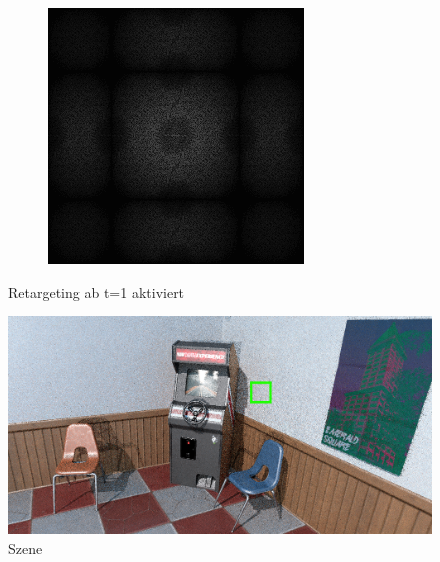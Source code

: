 \begin{figure}[H]
\begin{tcolorbox}[boxrule=4pt,sharp corners=downhill,title=Retargeting]
\begin{subfigure}[b]{0.2\textwidth}
        \includegraphics[width=\textwidth]{content/TemporalerAlg/Bilder/Retargeting/Spektren/Ausschnitt4.png}
        \label{pic:sorting_retarget_t4_FFT}
    \end{subfigure}
    \end{tcolorbox}
    \caption{Retargeting ab t=1 aktiviert}
    \label{pic:Sorting_retarget_over_seven_frames} 
\end{figure}

\begin{figure}[H]
    \centering \includegraphics[scale=.25]{content/TemporalerAlg/Bilder/Retargeting/Szene/Szene7.png}
    \caption{Szene}
    \label{fig:Sorting_retarget_Szene_t7}
\end{figure}


